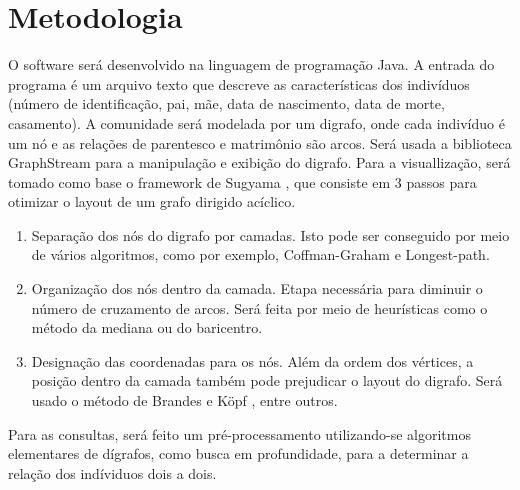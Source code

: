 \documentclass[a4paper,10pt]{article}
\begin{document}
\section{Metodologia}
O software será desenvolvido na linguagem de programação Java. 
A entrada do programa é um arquivo texto que descreve as características dos indivíduos
(número de identificação, pai, mãe, data de nascimento, data de morte, casamento).
A comunidade será modelada por um digrafo, onde cada indivíduo é um nó e as relações de parentesco e matrimônio são arcos.
Será usada a biblioteca GraphStream \cite{graphstream} para a manipulação e exibição do digrafo.
Para a visuallização, será tomado como base o framework de Sugyama \cite{sugiyama02}, que consiste em 3 passos para otimizar o layout de um grafo dirigido acíclico.
\begin{enumerate}
  \item Separação dos nós do digrafo por camadas. Isto pode ser conseguido por meio de vários algoritmos, como por exemplo, Coffman-Graham \cite{coffman} e Longest-path.
  \item Organização dos nós dentro da camada. Etapa necessária para diminuir o número de cruzamento de arcos. Será feita por meio de heurísticas como o método da mediana ou do baricentro.
  \item Designação das coordenadas para os nós. Além da ordem dos
    vértices, a posição dentro da camada também pode prejudicar o
    layout do digrafo. Será usado o método de Brandes e Köpf
    \cite{brandes02}, entre outros. 
\end{enumerate}
 Para as consultas, será feito um pré-processamento utilizando-se algoritmos elementares de dígrafos, como busca em profundidade, para a determinar a relação dos indíviduos dois a dois.
\end{document}
